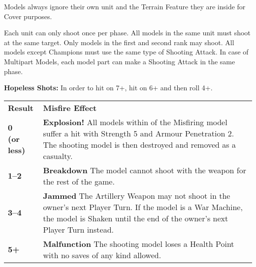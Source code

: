 \begin{minipage}[t]{0.485\textwidth}
Models always ignore their own unit and the Terrain Feature they are inside for Cover purposes.

\end{minipage}\hfill\begin{minipage}[t]{0.485\textwidth}


Each unit can only shoot once per phase. All models in the same unit must shoot at the same target. Only models in the first and second rank may shoot. All \rnf{} models except Champions must use the same type of Shooting Attack. In case of Multipart Models, each model part can make a Shooting Attack in the same phase.

\textbf{Hopeless Shots:} In order to hit on 7+, hit on 6+ and then roll 4+.


\begin{center}\alternaterowcolors
\begin{tabular}{M{1.4cm}m{\textwidth -1.4cm - 24pt}}
\hline
\textbf{Result} & \centering\textbf{Misfire Effect} \tabularnewline
\textbf{0\newline (or less)} & \textbf{Explosion!}\vspace*{3pt}\newline 
All models within  of the Misfiring model suffer a hit with Strength 5 and Armour Penetration 2. The shooting model is then destroyed and removed as a casualty. \tabularnewline
\textbf{1--2} & \textbf{Breakdown}\vspace*{3pt}\newline 
The model cannot shoot with the weapon for the rest of the game. \tabularnewline
\textbf{3--4} & \textbf{Jammed}\vspace*{3pt}\newline
The Artillery Weapon may not shoot in the owner's next Player Turn. If the model is a War Machine, the model is Shaken until the end of the owner's next Player Turn instead.\tabularnewline
\textbf{5+} & \textbf{Malfunction}\vspace*{3pt}\newline
The shooting model loses a Health Point with no saves of any kind allowed. \tabularnewline
\hline
\end{tabular}
\end{center}

\end{minipage}

